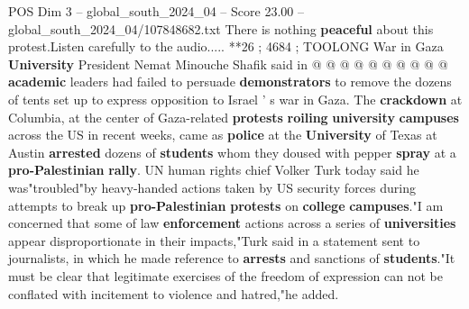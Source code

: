 \begin{textsample}{POS Dim 3 – global\_south\_2024\_04 – Score 23.00 – global\_south\_2024\_04/107848682.txt}
There is nothing \textbf{peaceful} about this protest.Listen carefully to the audio..... **26 ; 4684 ; TOOLONG War in Gaza \textbf{University} President Nemat Minouche Shafik said in @ @ @ @ @ @ @ @ @ @ \textbf{academic} leaders had failed to persuade \textbf{demonstrators} to remove the dozens of tents set up to express opposition to Israel ' s war in Gaza.
The \textbf{crackdown} at Columbia, at the center of Gaza-related \textbf{protests} \textbf{roiling} \textbf{university} \textbf{campuses} across the US in recent weeks, came as \textbf{police} at the \textbf{University} of Texas at Austin \textbf{arrested} dozens of \textbf{students} whom they doused with pepper \textbf{spray} at a \textbf{pro-Palestinian} \textbf{rally}.
UN human rights chief Volker Turk today said he was"troubled"by heavy-handed actions taken by US security forces during attempts to break up \textbf{pro-Palestinian} \textbf{protests} on \textbf{college} \textbf{campuses}."I am concerned that some of law \textbf{enforcement} actions across a series of \textbf{universities} appear disproportionate in their impacts,"Turk said in a statement sent to journalists, in which he made reference to \textbf{arrests} and sanctions of \textbf{students}."It must be clear that legitimate exercises of the freedom of expression can not be conflated with incitement to violence and hatred,"he added.

\end{textsample}
